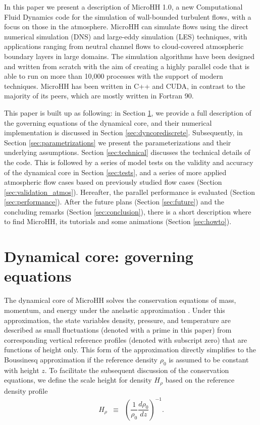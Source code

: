 \documentclass[gmd]{copernicus}
\begin{document}
\introduction  %
In this paper we present a description of MicroHH 1.0, a new Computational Fluid Dynamics code for the simulation of wall-bounded turbulent flows, with a focus on those in the atmosphere. MicroHH can simulate flows using the direct numerical simulation (DNS) and large-eddy simulation (LES) techniques, with applications ranging from neutral channel flows to cloud-covered atmospheric boundary layers in large domains. The simulation algorithms have been designed and written from scratch with the aim of creating a highly parallel code that is able to run on more than 10,000 processes with the support of modern techniques. MicroHH has been written in C++ and CUDA, in contrast to the majority of its peers, which are mostly written in Fortran 90.

This paper is built up as following: in Section \ref{sec:dyncore}, we provide a full description of the governing equations of the dynamical core, and their numerical implementation is discussed in Section \ref{sec:dyncorediscrete}. Subsequently, in Section \ref{sec:parametrizations} we present the parameterizations and their underlying assumptions. Section \ref{sec:technical} discusses the technical details of the code. This is followed by a series of model tests on the validity and accuracy of the dynamical core in Section \ref{sec:tests}, and a series of more applied atmospheric flow cases based on previously studied flow cases (Section \ref{sec:validation_atmos}). Hereafter, the parallel performance is evaluated (Section \ref{sec:performance}). After the  future plans (Section \ref{sec:future}) and the concluding remarks (Section \ref{sec:conclusion}), there is a short description where to find MicroHH, its tutorials and some animations (Section \ref{sec:howto}).

\section{Dynamical core: governing equations}\label{sec:dyncore}
The dynamical core of MicroHH solves the conservation equations of mass, momentum, and energy under the anelastic approximation \citep{Bannon1996}. Under this approximation, the state variables density, pressure, and temperature are described as small fluctuations (denoted with a prime in this paper) from corresponding vertical reference profiles (denoted with subscript zero) that are functions of height only. This form of the approximation directly simplifies to the Boussinesq approximation if the reference density $\rho_0$ is assumed to be constant with height $z$. To facilitate the subsequent discussion of the conservation equations, we define the scale height for density $H_\rho$ based on the reference density profile
\begin{eqnarray}
H_{\rho} & \equiv & \left( \dfrac{1}{\rho_0} \dfrac{d \rho_0}{dz} \right)^{-1}.
\end{eqnarray}
\end{document}
